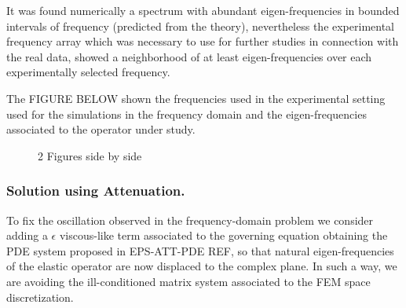 It was found numerically a spectrum with abundant eigen-frequencies in bounded intervals of frequency (predicted from the theory), nevertheless the experimental frequency array which was necessary to use for further studies in connection with the real data, showed a neighborhood of at least eigen-frequencies over each experimentally selected frequency. 

The FIGURE BELOW shown the frequencies used in the experimental setting used for the simulations in the frequency domain and the eigen-frequencies associated to the operator under study.

\begin{figure}%
    \centering
    \qquad
    \caption{2 Figures side by side}%
    \label{fig:example}%
\end{figure}


\subsubsection{Solution using Attenuation.}
To fix the oscillation observed in the frequency-domain problem we consider adding a $\epsilon$ viscous-like term associated to the governing equation obtaining the PDE system proposed in EPS-ATT-PDE REF, so that natural eigen-frequencies of the elastic operator are now displaced to the complex plane. In such a way, we are avoiding the ill-conditioned matrix system associated to the FEM space discretization.

